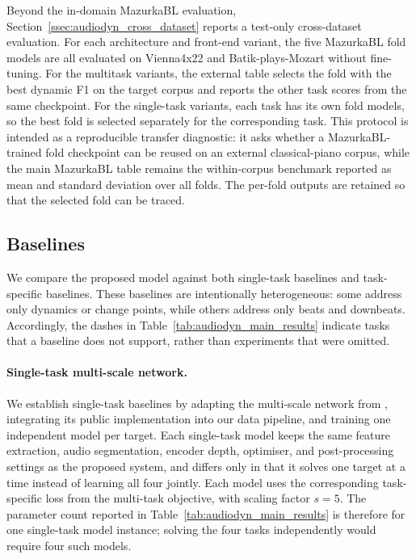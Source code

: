 Beyond the in-domain MazurkaBL evaluation, Section~\ref{ssec:audiodyn_cross_dataset} reports a test-only cross-dataset evaluation. For each architecture and front-end variant, the five MazurkaBL fold models are all evaluated on Vienna4x22 and Batik-plays-Mozart without fine-tuning. For the multitask variants, the external table selects the fold with the best dynamic F1 on the target corpus and reports the other task scores from the same checkpoint. For the single-task variants, each task has its own fold models, so the best fold is selected separately for the corresponding task. This protocol is intended as a reproducible transfer diagnostic: it asks whether a MazurkaBL-trained fold checkpoint can be reused on an external classical-piano corpus, while the main MazurkaBL table remains the within-corpus benchmark reported as mean and standard deviation over all folds. The per-fold outputs are retained so that the selected fold can be traced.

\subsection{Baselines}
\label{ssec:audiodyn_baselines}

We compare the proposed model against both single-task baselines and task-specific baselines. These baselines are intentionally heterogeneous: some address only dynamics or change points, while others address only beats and downbeats. Accordingly, the dashes in Table~\ref{tab:audiodyn_main_results} indicate tasks that a baseline does not support, rather than experiments that were omitted.

\paragraph{Single-task multi-scale network.}
We establish single-task baselines by adapting the multi-scale network from \cite{li2023frame}, integrating its public implementation into our data pipeline, and training one independent model per target. Each single-task model keeps the same feature extraction, audio segmentation, encoder depth, optimiser, and post-processing settings as the proposed system, and differs only in that it solves one target at a time instead of learning all four jointly. Each model uses the corresponding task-specific loss from the multi-task objective, with scaling factor $s=5$. The parameter count reported in Table~\ref{tab:audiodyn_main_results} is therefore for one single-task model instance; solving the four tasks independently would require four such models.


